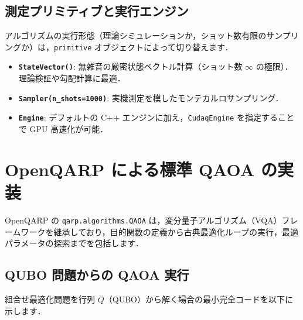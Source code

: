 \documentclass[11pt,a4paper]{ltjsarticle}
\begin{document}
\subsection{測定プリミティブと実行エンジン}
アルゴリズムの実行形態（理論シミュレーションか，ショット数有限のサンプリングか）は，\texttt{primitive} オブジェクトによって切り替えます．

\begin{itemize}\setlength{\itemsep}{1mm}
    \item \textbf{\texttt{StateVector()}}: 無雑音の厳密状態ベクトル計算（ショット数 $\infty$ の極限）．理論検証や勾配計算に最適．
    \item \textbf{\texttt{Sampler(n\_shots=1000)}}: 実機測定を模したモンテカルロサンプリング．
    \item \textbf{\texttt{Engine}}: デフォルトの C++ エンジンに加え，\texttt{CudaqEngine} を指定することで GPU 高速化が可能．
\end{itemize}

\section{OpenQARP による標準 QAOA の実装}

OpenQARP の \texttt{qarp.algorithms.QAOA} は，変分量子アルゴリズム（VQA）フレームワークを継承しており，目的関数の定義から古典最適化ループの実行，最適パラメータの探索までを包括します．

\subsection{QUBO 問題からの QAOA 実行}
組合せ最適化問題を行列 $Q$（QUBO）から解く場合の最小完全コードを以下に示します．
\end{document}
